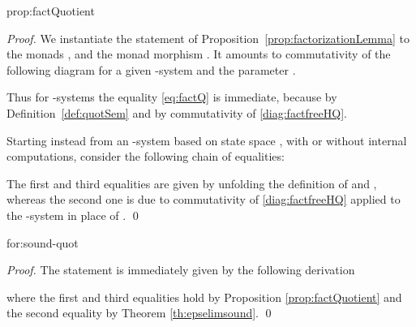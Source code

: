 \documentclass[oribibl,envcountsame,envcountsect,runningheads]{llncs}
\renewcommand{\>}{\rangle}
\newenvironment{corollary_for}[2][\empty]{\bigskip\noindent{\bf
    Corollary~\ref{#2}}\ifthenelse{\equal{#1}{\empty}}{{\bf.}}{ {\bf (#1).}}\it}{\vspace{0.5cm}}
\newenvironment{proposition_for}[2][\empty]{\bigskip\noindent{\bf
    Proposition~\ref{#2}}\ifthenelse{\equal{#1}{\empty}}{{\bf.}}{ {\bf
      (#1).}}\it}{\vspace{0.5cm}}
\begin{document}
\begin{proposition_for}{prop:factQuotient}
\propfactQuotient
\end{proposition_for}
\begin{proof} We instantiate the statement of Proposition~\ref{prop:factorizationLemma} to the monads ,  and the monad morphism . It amounts to commutativity of the following diagram for a given -system  and the parameter .

Thus for -systems the equality \eqref{eq:factQ} is immediate, because  by Definition~\ref{def:quotSem} and  by commutativity of \eqref{diag:factfreeHQ}.

Starting instead from an -system  based on state space , with or without internal computations, consider the following chain of equalities:

The first and third equalities are given by unfolding the definition of  and , whereas the second one is due to commutativity of \eqref{diag:factfreeHQ} applied to the -system  in place of . \qed
\end{proof}

\begin{corollary_for} {for:sound-quot}
\corSoundQuot
\end{corollary_for}
\begin{proof} The statement is immediately given by the following derivation

where the first and third equalities hold by Proposition \ref{prop:factQuotient} and the second equality by Theorem \ref{th:epselimsound}. \qed
\end{proof}
\end{document}
